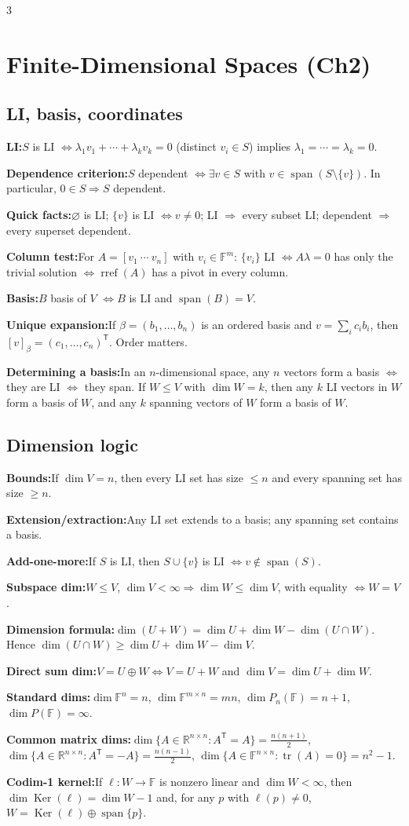 \documentclass[10pt]{article}
\newcommand{\R}{\mathbb{R}}
\newcommand{\F}{\mathbb{F}}
\newcommand{\Ker}{\operatorname{Ker}}
\newcommand{\spann}{\operatorname{span}}
\newcommand{\tr}{\operatorname{tr}}
\newcommand{\T}{^{\mathsf T}}
\newenvironment{cheatitems}{\par\vspace{-1pt}}{\par\vspace{-1pt}}
\newcommand{\cheatrow}[2]{%
  \par\noindent\textbf{#1:}\nobreak\enspace #2\par
}
\begin{document}
\begin{multicols}{3}
\section*{Finite-Dimensional Spaces (Ch2)}

\subsection*{LI, basis, coordinates}
\begin{cheatitems}
\cheatrow{LI}{$S$ is LI $\iff \lambda_1v_1+\cdots+\lambda_kv_k=0$ (distinct $v_i\in S$) implies $\lambda_1=\cdots=\lambda_k=0$.}
\cheatrow{Dependence criterion}{$S$ dependent $\iff \exists v\in S$ with $v\in\spann(S\setminus\{v\})$. In particular, $0\in S\Rightarrow S$ dependent.}
\cheatrow{Quick facts}{$\varnothing$ is LI; $\{v\}$ is LI $\iff v\neq 0$; LI $\Rightarrow$ every subset LI; dependent $\Rightarrow$ every superset dependent.}
\cheatrow{Column test}{For $A=[v_1\ \cdots\ v_n]$ with $v_i\in\F^m$: $\{v_i\}$ LI $\iff A\lambda=0$ has only the trivial solution $\iff \operatorname{rref}(A)$ has a pivot in every column.}
\cheatrow{Basis}{$B$ basis of $V$ $\iff B$ is LI and $\spann(B)=V$.}
\cheatrow{Unique expansion}{If $\beta=(b_1,\dots,b_n)$ is an ordered basis and $v=\sum_i c_i b_i$, then $[v]_\beta=(c_1,\dots,c_n)\T$. Order matters.}
\cheatrow{Determining a basis}{In an $n$-dimensional space, any $n$ vectors form a basis $\iff$ they are LI $\iff$ they span. If $W\le V$ with $\dim W=k$, then any $k$ LI vectors in $W$ form a basis of $W$, and any $k$ spanning vectors of $W$ form a basis of $W$.}
\end{cheatitems}

\subsection*{Dimension logic}
\begin{cheatitems}
\cheatrow{Bounds}{If $\dim V=n$, then every LI set has size $\le n$ and every spanning set has size $\ge n$.}
\cheatrow{Extension/extraction}{Any LI set extends to a basis; any spanning set contains a basis.}
\cheatrow{Add-one-more}{If $S$ is LI, then $S\cup\{v\}$ is LI $\iff v\notin\spann(S)$.}
\cheatrow{Subspace dim}{$W\le V$, $\dim V<\infty \Rightarrow \dim W\le \dim V$, with equality $\iff W=V$.}
\cheatrow{Dimension formula}{$\dim(U+W)=\dim U+\dim W-\dim(U\cap W)$. Hence $\dim(U\cap W)\ge \dim U+\dim W-\dim V$.}
\cheatrow{Direct sum dim}{$V=U\oplus W \iff V=U+W$ and $\dim V=\dim U+\dim W$.}
\cheatrow{Standard dims}{$\dim \F^n=n$, $\dim \F^{m\times n}=mn$, $\dim P_n(\F)=n+1$, $\dim P(\F)=\infty$.}
\cheatrow{Common matrix dims}{$\dim\{A\in\R^{n\times n}:A\T=A\}=\frac{n(n+1)}2$, $\dim\{A\in\R^{n\times n}:A\T=-A\}=\frac{n(n-1)}2$, $\dim\{A\in\F^{n\times n}:\tr(A)=0\}=n^2-1$.}
\cheatrow{Codim-1 kernel}{If $\ell:W\to\F$ is nonzero linear and $\dim W<\infty$, then $\dim\Ker(\ell)=\dim W-1$ and, for any $p$ with $\ell(p)\neq 0$, $W=\Ker(\ell)\oplus\spann\{p\}$.}
\end{cheatitems}


\end{multicols}
\end{document}
